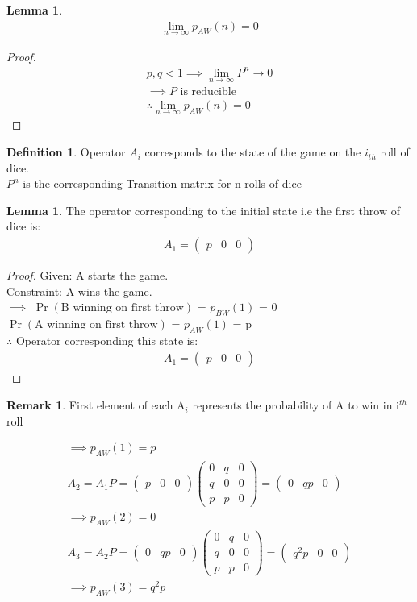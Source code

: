 \documentclass[journal,12pt,twocolumn]{IEEEtran}
\theoremstyle{definition}
\newtheorem{definition}{Definition}[section]
\newtheorem{lemma}[theorem]{Lemma}
\newtheorem*{remark}{Remark}
\providecommand{\pr}[1]{\ensuremath{\Pr\left(#1\right)}}
\newcommand{\myvec}[1]{\ensuremath{\begin{pmatrix}#1\end{pmatrix}}}
\numberwithin{equation}{subsection}
\begin{document}
\begin{lemma} \large
    \begin{align*}
        \lim_{n \to \infty}p_{AW}(n) = 0
    \end{align*}
\end{lemma}
\begin{proof}
    \begin{align*}
        p , q < 1
        \implies \lim_{n \to \infty} P^n \xrightarrow{} 0\\
        \implies P \text{ is reducible}\\
        \therefore \lim_{n \to \infty}p_{AW}(n) = 0
    \end{align*}
\end{proof}
\begin{definition}
    Operator $A_i$ corresponds to the state of the game on the $i_{th}$ roll of dice.\\
    $P^n$ is the corresponding Transition matrix for n rolls of dice\\
\end{definition}

\begin{lemma}
    The operator corresponding to the initial state i.e the first throw of dice is:
    \begin{align*}
        A_1 = \myvec{p & 0 & 0}
    \end{align*}
\end{lemma}
\begin{proof}
    Given: A starts the game.\\
    Constraint: A wins the game.\\
    $\implies$ \pr{\text{B winning on first throw}} = $p_{BW}(1)$ = 0\\
    \pr{\text{A winning on first throw}} = $p_{AW}(1)$ = p\\
    $\therefore$ Operator corresponding this state is:
    \begin{align*}
        A_1 = \myvec{p & 0 & 0}
    \end{align*}
\end{proof}
\begin{remark}
    First element of each A$_i$ represents the probability of A to win in i$^{th}$ roll
\end{remark}

\begin{align*}
    \implies p_{AW}(1) = p\\
    A_2 = A_1 P = \myvec{p & 0 & 0}\myvec{0 & q & 0\\ q & 0 & 0\\ p & p & 0}  = \myvec{0 & qp & 0}\\
    \implies  p_{AW}(2) = 0\\
    A_3 = A_2 P = \myvec{0 & qp & 0} \myvec{0 & q & 0\\ q & 0 & 0\\ p & p & 0}= \myvec{q^2 p & 0 & 0}\\
    \implies  p_{AW}(3) = q^2 p
\end{align*}
\end{document}
